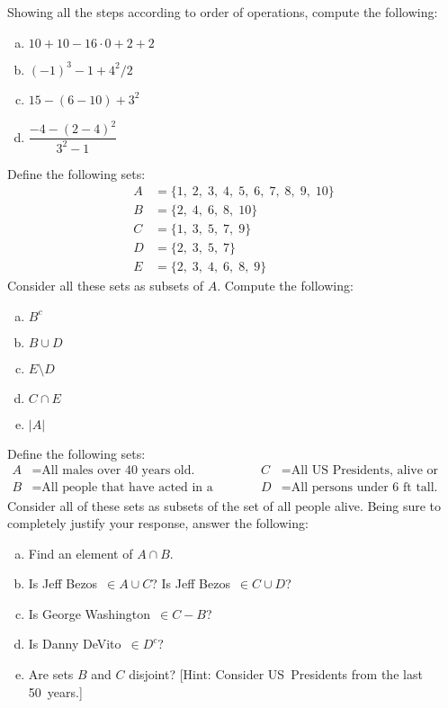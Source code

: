 \documentclass[11pt,letterpaper]{article}
\begin{document}

 Showing all the steps according to order of operations, compute the following:
	\begin{enumerate}[(a)]
	\item $10 + 10 - 16 \cdot 0 + 2 + 2$
	\item $(-1)^3 - 1 + 4^2/2$
	\item $15 - (6 - 10) + 3^2$
	\item $\dfrac{-4 - (2 - 4)^2}{3^2 - 1}$
	\end{enumerate}



\newpage



 Define the following sets:
	\[
	\begin{aligned}
	A&= \{ 1,\; 2, \; 3,\; 4,\; 5,\; 6,\; 7,\; 8,\; 9,\; 10 \} \\
	B&= \{ 2,\; 4,\; 6,\; 8,\; 10 \} \\
	C&= \{ 1,\; 3,\; 5,\; 7,\; 9 \} \\
	D&= \{ 2,\; 3,\; 5,\; 7 \} \\
	E&= \{ 2,\; 3,\; 4,\; 6,\; 8,\; 9 \}
	\end{aligned}
	\]
Consider all these sets as subsets of $A$. Compute the following:
	\begin{enumerate}[(a)]
	\item $B^c$
	\item $B \cup D$
	\item $E \setminus D$
	\item $C \cap E$
	\item $|A|$
	\end{enumerate}



\newpage



 Define the following sets:
	\[
	\begin{aligned}
	A&= \text{All males over 40~years old.} & & & C&= \text{All US Presidents, alive or dead.} \\
	B&= \text{All people that have acted in a movie.} & & & D&= \text{All persons under 6~ft tall.} 
	\end{aligned}
	\]
Consider all of these sets as subsets of the set of all people alive. Being sure to completely justify your response, answer the following:
	\begin{enumerate}[(a)]
	\item Find an element of $A \cap B$. 
	\item Is Jeff Bezos~$\in A \cup C$? Is Jeff Bezos~$\in C \cup D$?
	\item Is George Washington~$\in C - B$?
	\item Is Danny DeVito~$\in D^c$?
	\item Are sets $B$ and $C$ disjoint? [Hint: Consider US~Presidents from the last 50~years.]
	\end{enumerate}
\end{document}
